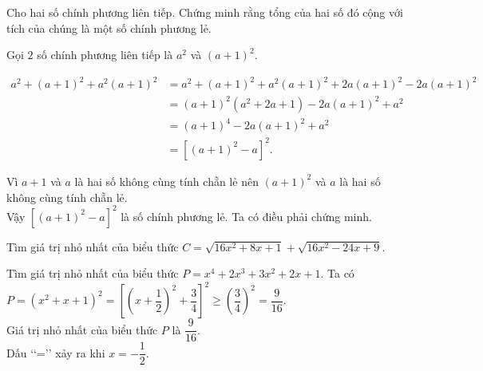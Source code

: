 \begin{vn}
	Cho hai số chính phương liên tiếp. Chứng minh rằng tổng của hai số đó cộng với tích của chúng là một số chính phương lẻ.
	\loigiai
	{
		Gọi $2$ số chính phương liên tiếp là $a^2$ và $(a+1)^2$.
		\begin{center}
			$\begin{array}{ll}
			a^2+(a+1)^2+a^2(a+1)^2&=a^2+(a+1)^2+a^2(a+1)^2+2a(a+1)^2-2a(a+1)^2\\
			&=(a+1)^2(a^2+2a+1)-2a(a+1)^2+a^2\\
			&=(a+1)^4-2a(a+1)^2+a^2\\
			&=\left[(a+1)^2-a\right]^2.
			\end{array}	$\\
		\end{center}
		Vì $a+1$ và $a$ là hai số không cùng tính chẵn lẻ nên $(a+1)^2$ và $a$ là hai số không cùng tính chẵn lẻ.\\
		Vậy $\left[(a+1)^2-a\right]^2$ là số chính phương lẻ. Ta có điều phải chứng minh.
	}
\end{vn}
\begin{vn}
	Tìm giá trị nhỏ nhất của biểu thức $C=\sqrt{16x^2+8x+1}+\sqrt{16x^2-24x+9}$.
\end{vn}
\begin{vn}
	Tìm giá trị nhỏ nhất của biểu thức $P=x^4+2x^3+3x^2+2x+1.$
	\loigiai
	{
		Ta có $P=\left(x^2+x+1\right)^2=\left[\left(x+\dfrac{1}{2}\right)^2+\dfrac{3}{4}\right]^2\ge \left(\dfrac{3}{4}\right)^2=\dfrac{9}{16}$.\\
		Giá trị nhỏ nhất của biểu thức $P$ là $\dfrac{9}{16}$. \\
		Dấu \lq\lq=\rq\rq\text{ } xảy ra khi $x=-\dfrac{1}{2}.$ 
	}
\end{vn}
